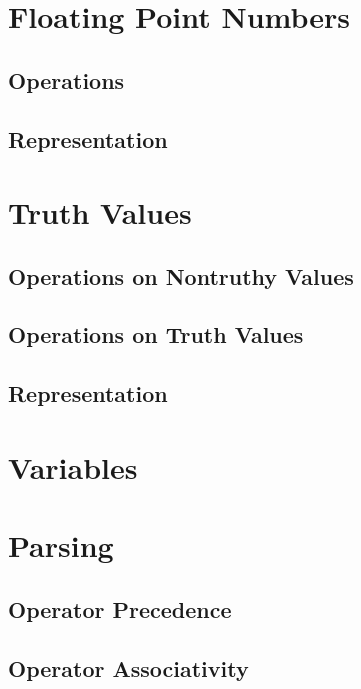 



\section{Floating Point Numbers}
\label{primitives:float}

\subsection{Operations}
\subsection{Representation}
\csharpsubsection{\csharp}

\section{Truth Values}


\subsection{Operations on Nontruthy Values}
\subsection{Operations on Truth Values}

\subsection{Representation}


\csharpsubsection{\csharp}

\section{Variables}
\csharpsubsection{\csharp}

\section{Parsing}
\subsection{Operator Precedence}
\subsection{Operator Associativity}

